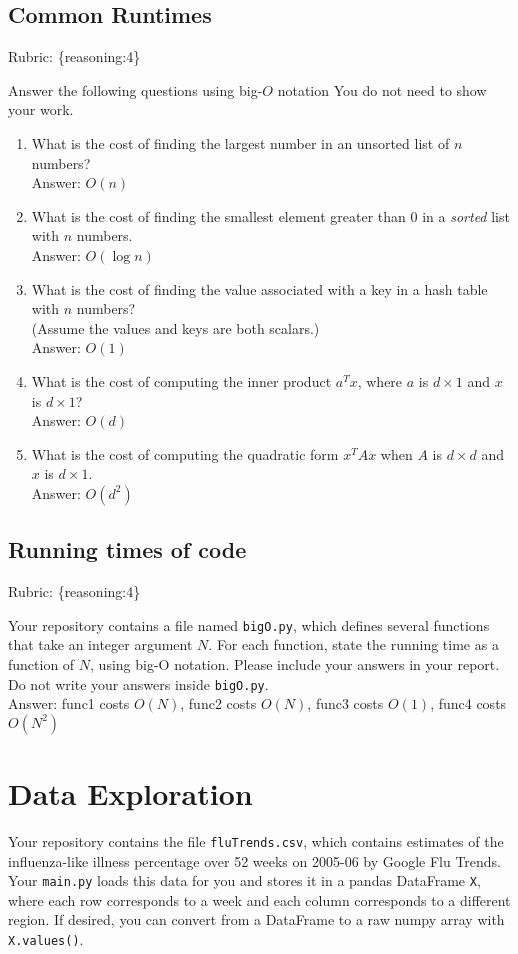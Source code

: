 \documentclass{article}
\def\rubric#1{\gre{Rubric: \{#1\}}}{}
\def\blu#1{{\color{blu}#1}}
\def\gre#1{{\color{gre}#1}}
\def\ans#1{\gre{Answer: #1}}{}
\begin{document}
\subsection{Common Runtimes}
\rubric{reasoning:4}

\blu{Answer the following questions using big-$O$ notation} You do not need to show your work.
\begin{enumerate}
\item What is the cost of finding the largest number in an unsorted list of $n$ numbers? \\
\ans{$O(n)$}
\item What is the cost of finding the smallest element greater than 0 in a \emph{sorted} list with $n$ numbers. \\
\ans{$O(\log n)$}
\item What is the cost of finding the value associated with a key in a hash table with $n$ numbers? \\(Assume the values and keys are both scalars.)\\
\ans{$O(1)$}
\item What is the cost of computing the inner product $a^Tx$, where $a$ is $d \times 1$ and $x$ is $d \times 1$? \\
\ans{$O(d)$}
\item What is the cost of computing the quadratic form $x^TAx$ when $A$ is $d \times d$ and $x$ is $d \times 1$. \\
\ans{$O(d^2)$}
\end{enumerate}

\subsection{Running times of code}
\rubric{reasoning:4}

Your repository contains a file named \texttt{bigO.py}, which defines several functions
that take an integer argument $N$. For each function, \blu{state the running time as a function of $N$, using big-O notation}.
Please include your answers in your report. Do not write your answers inside \texttt{bigO.py}. \\
\ans{func1 costs $O(N)$, func2 costs $O(N)$, func3 costs $O(1)$, func4 costs $O(N^2)$ \\}
\section{Data Exploration}


Your repository contains the file \texttt{fluTrends.csv}, which contains estimates
of the influenza-like illness percentage over 52 weeks on 2005-06 by Google Flu Trends.
Your \texttt{main.py} loads this data for you and stores it in a pandas DataFrame \texttt{X},
where each row corresponds to a week and each column
corresponds to a different
region. If desired, you can convert from a DataFrame to a raw numpy array with \texttt{X.values()}.
\end{document}
